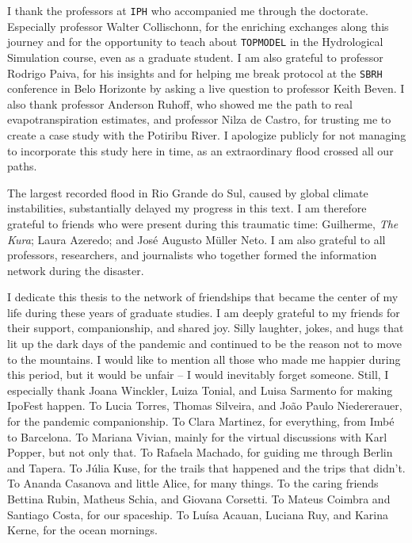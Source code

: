 \documentclass[./main_en.tex]{subfiles}
\begin{document}
\par I thank the professors at \texttt{IPH} who accompanied me through the doctorate. Especially professor Walter Collischonn, for the enriching exchanges along this journey and for the opportunity to teach about \texttt{TOPMODEL} in the Hydrological Simulation course, even as a graduate student. I am also grateful to professor Rodrigo Paiva, for his insights and for helping me break protocol at the \texttt{SBRH} conference in Belo Horizonte by asking a live question to professor Keith Beven. I also thank professor Anderson Ruhoff, who showed me the path to real evapotranspiration estimates, and professor Nilza de Castro, for trusting me to create a case study with the Potiribu River. I apologize publicly for not managing to incorporate this study here in time, as an extraordinary flood crossed all our paths.

\par The largest recorded flood in Rio Grande do Sul, caused by global climate instabilities, substantially delayed my progress in this text. I am therefore grateful to friends who were present during this traumatic time: Guilherme, \textit{The Kura}; Laura Azeredo; and José Augusto Müller Neto. I am also grateful to all professors, researchers, and journalists who together formed the information network during the disaster.

\par I dedicate this thesis to the network of friendships that became the center of my life during these years of graduate studies. I am deeply grateful to my friends for their support, companionship, and shared joy. Silly laughter, jokes, and hugs that lit up the dark days of the pandemic and continued to be the reason not to move to the mountains. I would like to mention all those who made me happier during this period, but it would be unfair -- I would inevitably forget someone. Still, I especially thank Joana Winckler, Luiza Tonial, and Luisa Sarmento for making IpoFest happen. To Lucia Torres, Thomas Silveira, and João Paulo Niedererauer, for the pandemic companionship. To Clara Martinez, for everything, from Imbé to Barcelona. To Mariana Vivian, mainly for the virtual discussions with Karl Popper, but not only that. To Rafaela Machado, for guiding me through Berlin and Tapera. To Júlia Kuse, for the trails that happened and the trips that didn’t. To Ananda Casanova and little Alice, for many things. To the caring friends Bettina Rubin, Matheus Schia, and Giovana Corsetti. To Mateus Coimbra and Santiago Costa, for our spaceship. To Luísa Acauan, Luciana Ruy, and Karina Kerne, for the ocean mornings.
\end{document}
